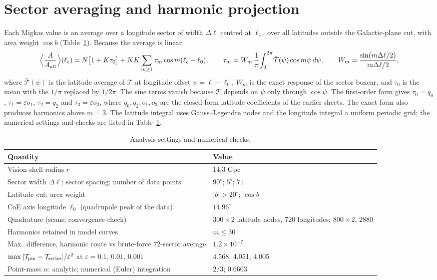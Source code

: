 \documentclass[10pt]{article}
\begin{document}
\section{Sector averaging and harmonic projection}
Each Migkas value is an average over a longitude sector of width $\Delta\ell$ centred at $\ell_c$, over all latitudes outside the Galactic-plane cut, with area weight $\cos b$ (Table~\ref{tab:setup}). Because the average is linear,
\begin{equation}
\Big\langle\frac{A}{A_{\rm all}}\Big\rangle(\ell_c)=N\big[1+K\tau_0\big]+NK\sum_{m\ge1}\tau_m\cos m(\ell_c-\ell_0),\qquad
\tau_m=W_m\,\frac{1}{\pi}\!\int_0^{2\pi}\!\bar{\mathcal T}(\psi)\cos m\psi\,d\psi,\qquad W_m=\frac{\sin(m\Delta\ell/2)}{m\Delta\ell/2},
\label{eq:tau}
\end{equation}
where $\bar{\mathcal T}(\psi)$ is the latitude average of $\mathcal T$ at longitude offset $\psi=\ell-\ell_0$, $W_m$ is the exact response of the sector boxcar, and $\tau_0$ is the mean with the $1/\pi$ replaced by $1/2\pi$. The sine terms vanish because $\mathcal T$ depends on $\psi$ only through $\cos\psi$. The first-order form gives $\tau_0=q_0$, $\tau_1=\varepsilon o_1$, $\tau_2=q_2$ and $\tau_3=\varepsilon o_3$, where $q_0,q_2,o_1,o_3$ are the closed-form latitude coefficients of the earlier sheets. The exact form also produces harmonics above $m=3$. The latitude integral uses Gauss--Legendre nodes and the longitude integral a uniform periodic grid; the numerical settings and checks are listed in Table~\ref{tab:setup}.


\begin{table}[!htb]\centering\small
\caption{Analysis settings and numerical checks.}\label{tab:setup}
\begin{tabular}{ll}\toprule
Quantity & Value\\\midrule
Vision-shell radius $r$ & $14.3$ Gpc\\
Sector width $\Delta\ell$; sector spacing; number of data points & $90^\circ$; $5^\circ$; $71$\\
Latitude cut; area weight & $|b|>20^\circ$; $\cos b$\\
CoE axis longitude $\ell_0$ (quadrupole peak of the data) & $14.96^\circ$\\
Quadrature (scans; convergence check) & $300\times2$ latitude nodes, $720$ longitudes; $800\times2$, $2880$\\
Harmonics retained in model curves & $m\le30$\\
Max.\ difference, harmonic route vs brute-force $72$-sector average & $1.2\times10^{-7}$\\
$\max|\mathcal T_{\rm pm}-\mathcal T_{\rm series}|/\varepsilon^2$ at $\varepsilon=0.1,\,0.01,\,0.001$ & 4.568, 4.051, 4.005\\
Point-mass $\alpha$: analytic; numerical (Euler) integration & $2/3$; $0.6603$\\\bottomrule
\end{tabular}
\end{table}
\end{document}
